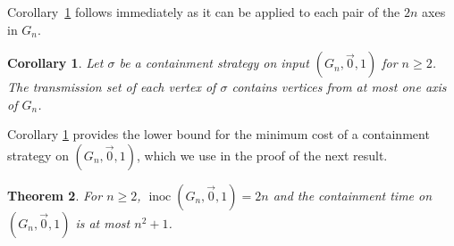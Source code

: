 \documentclass[unknownkeysallowed]{article}
\newtheorem{theorem}{Theorem}[section]
\newtheorem{corollary}[theorem]{Corollary}
\theoremstyle{definition}\newtheorem{strategy}{Strategy}
\theoremstyle{definition}\newtheorem{notation}{Notation}[theorem]
\DeclareMathOperator{\inoc}{inoc}
\begin{document}
Corollary~\ref{cor:axes} follows immediately as it can be applied to each pair of the $2n$ axes in $G_n$.  

\begin{corollary}\label{cor:axes} Let $\sigma$ be a containment strategy on input $(G_n,\vec{0},1)$ for $n \geq 2$.   The transmission set of each vertex of $\sigma$ contains vertices from at most one axis of $G_n$.  
\end{corollary}

Corollary \ref{cor:axes} provides the lower bound for the minimum cost of a containment strategy on $(G_n,\vec{0},1)$, which we use in the proof of the next result. 


\begin{theorem}\label{thm:uppercart} For $n \geq 2$, $\inoc(G_n,\vec{0},1)=2n$ and the containment time on $(G_n,\vec{0},1)$ is at most $n^2+1$. 
\end{theorem}
\end{document}
